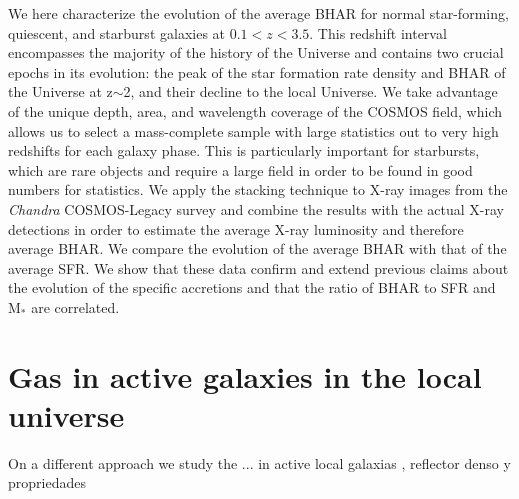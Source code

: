         We here characterize the evolution of the average BHAR for normal star-forming, quiescent, and starburst galaxies at $0.1<z<3.5$. This redshift interval encompasses the majority of the history of the Universe and contains two crucial epochs in its evolution: the peak of the star formation rate density and BHAR of the Universe at z$\sim$2, and their decline to the local Universe.
        We take advantage of the unique depth, area, and wavelength coverage of the COSMOS field, which allows us to select a mass-complete sample with large statistics out to very high redshifts for each galaxy phase. This is particularly important for starbursts, which are rare objects and require a large field in order to be found in good numbers for statistics. We apply the stacking technique to X-ray images from the \textit{Chandra} COSMOS-Legacy survey \citep{2016ApJ...819...62C} and combine the results with the actual X-ray detections in order to estimate the average X-ray luminosity and therefore average BHAR. We compare the evolution of the average BHAR with that of the average SFR. We show that these data confirm and extend previous claims about the evolution of the specific accretions and that the ratio of BHAR to SFR and M$_*$ are correlated. 
        
        \section{Gas in active galaxies in the local universe}
        On a different approach we study the ... in active local galaxias , reflector denso y propriedades
   

